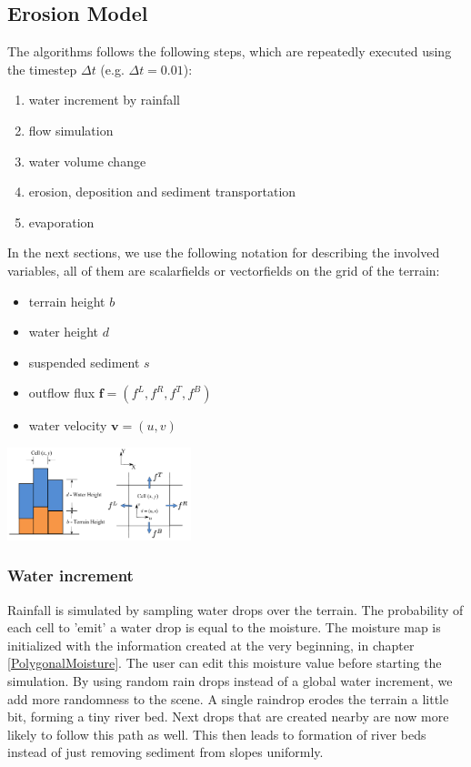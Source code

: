 \documentclass[journal, letterpaper]{IEEEtran}
\begin{document}
\subsection{Erosion Model}
The algorithms follows the following steps, which are repeatedly executed using the timestep $\Delta t$ (e.g. $\Delta t = 0.01$):
\begin{enumerate}
	\item water increment by rainfall
	\item flow simulation
	\item water volume change
	\item erosion, deposition and sediment transportation
	\item evaporation
\end{enumerate}
In the next sections, we use the following notation for describing the involved variables, all of them are scalarfields or vectorfields on the grid of the terrain:
\begin{itemize}
	\item terrain height $b$
	\item water height $d$
	\item suspended sediment $s$
	\item outflow flux $\textbf{f}=(f^L,f^R,f^T,f^B)$
	\item water velocity $\textbf{v}=(u,v)$
\end{itemize}
\begin{center}
	\includegraphics[width=0.4\textwidth]{images/erosionVariables}
\end{center}

\subsubsection{Water increment}
Rainfall is simulated by sampling water drops over the terrain. The probability of each cell to 'emit' a water drop is equal to the moisture. The moisture map is initialized with the information created at the very beginning, in chapter \ref{PolygonalMoisture}. The user can edit this moisture value before starting the simulation. By using random rain drops instead of a global water increment, we add more randomness to the scene. A single raindrop erodes the terrain a little bit, forming a tiny river bed. Next drops that are created nearby are now more likely to follow this path as well. This then leads to formation of river beds instead of just removing sediment from slopes uniformly.
\end{document}
